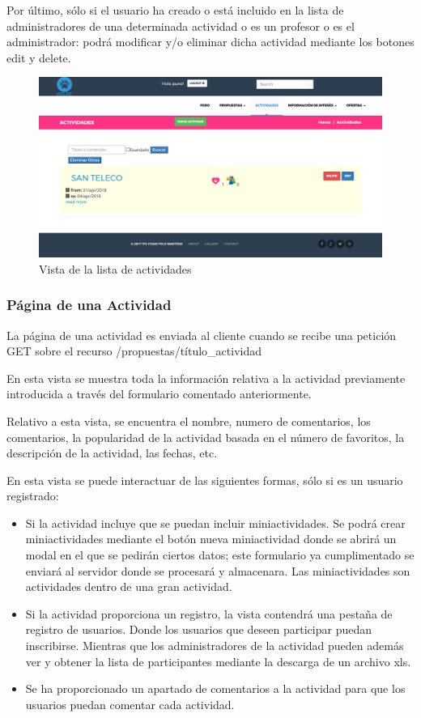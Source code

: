 Por último, sólo si el usuario ha creado o está incluido en la lista de administradores de una determinada actividad o es un profesor o es el administrador: podrá modificar y/o eliminar dicha actividad mediante los botones edit y delete.

\begin{figure}[H]
   \centering
   \includegraphics[width=12cm]{img/actividades}
   \caption{Vista de la lista de actividades}
   \label{figura:actividades}
\end{figure}

\subsubsection{Página de una Actividad}
\label{subsubsec:actividad}


La página de una actividad es enviada al cliente cuando se recibe una petición GET sobre el recurso /propuestas/{título\_actividad}


En esta vista se muestra toda la información relativa a la actividad previamente introducida a través del formulario comentado anteriormente. 


Relativo a esta vista, se encuentra el nombre, numero de comentarios, los comentarios, la popularidad de la actividad basada en el número de favoritos, la descripción de la actividad, las fechas, etc.


En esta vista se puede interactuar de las siguientes formas, sólo si es un usuario registrado:



\begin{itemize}
\item Si la actividad incluye que se puedan incluir miniactividades. Se podrá crear miniactividades mediante el botón nueva miniactividad donde se abrirá un modal en el que se pedirán ciertos datos; este formulario ya cumplimentado se enviará al servidor donde se procesará y almacenara. Las miniactividades son actividades dentro de una gran actividad.  
\item Si la actividad proporciona un registro, la vista contendrá una pestaña de registro de usuarios. Donde los usuarios que deseen participar puedan inscribirse. Mientras que los administradores de la actividad pueden además ver y obtener la lista de participantes mediante la descarga de un archivo xls.
\item Se ha proporcionado un apartado de comentarios a la actividad para que los usuarios puedan comentar cada actividad.
\end{itemize}

